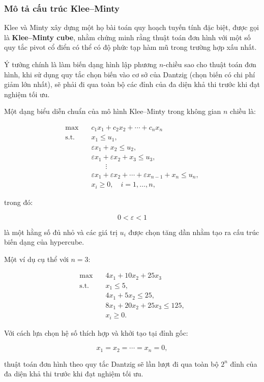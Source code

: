 \documentclass[fontsize=13pt,a4paper]{report}
\begin{document}
\subsubsection{Mô tả cấu trúc Klee--Minty}

Klee và Minty xây dựng một họ bài toán quy hoạch tuyến tính đặc biệt, được gọi là \textbf{Klee--Minty cube}, nhằm chứng minh rằng thuật toán đơn hình với một số quy tắc pivot cổ điển có thể có độ phức tạp hàm mũ trong trường hợp xấu nhất.

Ý tưởng chính là làm biến dạng hình lập phương \(n\)-chiều sao cho thuật toán đơn hình, khi sử dụng quy tắc chọn biến vào cơ sở của Dantzig (chọn biến có chi phí giảm lớn nhất), sẽ phải đi qua toàn bộ các đỉnh của đa diện khả thi trước khi đạt nghiệm tối ưu.

Một dạng biểu diễn chuẩn của mô hình Klee--Minty trong không gian \(n\) chiều là:

\[
\begin{aligned}
\max \quad & c_1x_1+c_2x_2+\cdots+c_nx_n \\
\text{s.t.}\quad
& x_1 \le u_1, \\
& \varepsilon x_1 + x_2 \le u_2, \\
& \varepsilon x_1 + \varepsilon x_2 + x_3 \le u_3, \\
& \qquad \vdots \\
& \varepsilon x_1+\varepsilon x_2+\cdots+\varepsilon x_{n-1}+x_n \le u_n, \\
& x_i \ge 0,\quad i=1,\dots,n,
\end{aligned}
\]

trong đó:

\[
0<\varepsilon<1
\]

là một hằng số đủ nhỏ và các giá trị \(u_i\) được chọn tăng dần nhằm tạo ra cấu trúc biến dạng của hypercube.

Một ví dụ cụ thể với \(n=3\):

\[
\begin{aligned}
\max \quad & 4x_1+10x_2+25x_3 \\
\text{s.t.}\quad
& x_1 \le 5, \\
& 4x_1+5x_2 \le 25, \\
& 8x_1+20x_2+25x_3 \le 125, \\
& x_i \ge 0.
\end{aligned}
\]

Với cách lựa chọn hệ số thích hợp và khởi tạo tại đỉnh gốc:

\[
x_1=x_2=\cdots=x_n=0,
\]

thuật toán đơn hình theo quy tắc Dantzig sẽ lần lượt đi qua toàn bộ \(2^n\) đỉnh của đa diện khả thi trước khi đạt nghiệm tối ưu.
\end{document}

